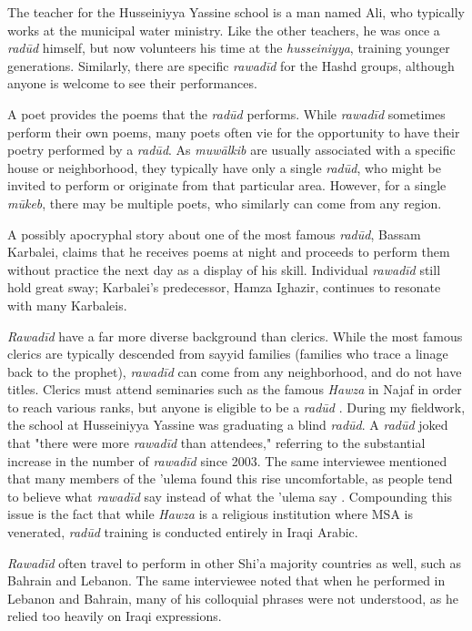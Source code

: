 The teacher for the Husseiniyya Yassine school is a man named Ali, who typically works at the municipal water ministry. Like the other teachers, he was once a \emph{radūd} himself, but now volunteers his time at the \emph{husseiniyya}, training younger generations. Similarly, there are specific \emph{rawadīd} for the Hashd groups, although anyone is welcome to see their performances. 

A poet provides the poems that the \emph{radūd} performs. While \emph{rawadīd} sometimes perform their own poems, many poets often vie for the opportunity to have their poetry performed by a \emph{radūd}. As \emph{muwālkib} are usually associated with a specific house or neighborhood, they typically have only a single \emph{radūd}, who might be invited to perform or originate from that particular area. However, for a single \emph{mūkeb}, there may be multiple poets, who similarly can come from any region. 

A possibly apocryphal story about one of the most famous \emph{radūd}, Bassam Karbalei, claims that he receives poems at night and proceeds to perform them without practice the next day as a display of his skill\cite{al-husseini_interview_2022}. Individual \emph{rawadīd} still hold great sway; Karbalei's predecessor, Hamza Ighazir, continues to resonate with many Karbaleis. 

\emph{Rawadīd} have a far more diverse background than clerics. While the most famous clerics are typically descended from sayyid families (families who trace a linage back to the prophet), \emph{rawadīd} can come from any neighborhood, and do not have titles. Clerics must attend seminaries such as the famous \emph{Hawza} in Najaf in order to reach various ranks, but anyone is eligible to be a \emph{radūd} \cite{al-husseini_interview_2022}. During my fieldwork, the school at Husseiniyya Yassine was graduating a blind \emph{radūd}. A \emph{radūd} joked that "there were more \emph{rawadīd} than attendees," referring to the substantial increase in the number of \emph{rawadīd} since 2003. The same interviewee mentioned that many members of the 'ulema found this rise uncomfortable, as people tend to believe what \emph{rawadīd} say instead of what the 'ulema say \cite{al-husseini_interview_2022}. Compounding this issue is the fact that while \emph{Hawza} is a religious institution where MSA is venerated, \emph{radūd} training is conducted entirely in Iraqi Arabic. 

\emph{Rawadīd} often travel to perform in other Shi'a majority countries as well, such as Bahrain and Lebanon. The same interviewee noted that when he performed in Lebanon and Bahrain, many of his colloquial phrases were not understood, as he relied too heavily on Iraqi expressions.

